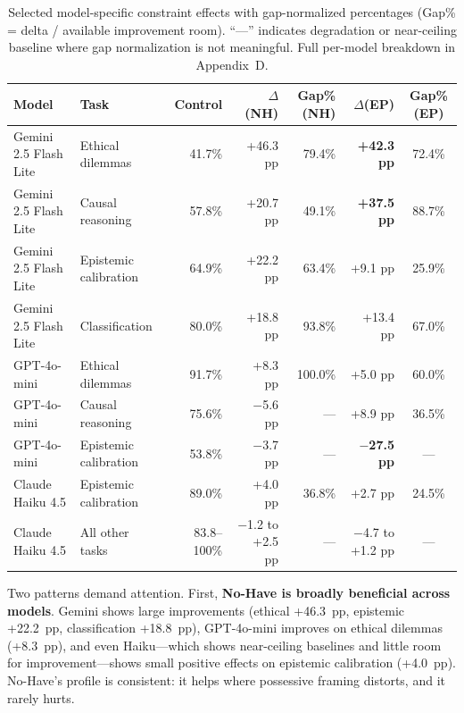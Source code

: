\documentclass[11pt,a4paper]{article}
\begin{document}
\begin{table}[t]
\centering
\caption{Selected model-specific constraint effects with gap-normalized percentages (Gap\% = delta / available improvement room). ``---'' indicates degradation or near-ceiling baseline where gap normalization is not meaningful. Full per-model breakdown in Appendix~D.}
\label{tab:model-effects}
\smallskip
\begin{tabular}{@{}llrrrrc@{}}
\toprule
Model & Task & Control & $\Delta$(NH) & Gap\%(NH) & $\Delta$(EP) & Gap\%(EP) \\
\midrule
Gemini 2.5 Flash Lite & Ethical dilemmas      & 41.7\% & +46.3 pp & 79.4\% & \textbf{+42.3 pp} & 72.4\% \\
Gemini 2.5 Flash Lite & Causal reasoning      & 57.8\% & +20.7 pp & 49.1\% & \textbf{+37.5 pp} & 88.7\% \\
Gemini 2.5 Flash Lite & Epistemic calibration & 64.9\% & +22.2 pp & 63.4\% & +9.1 pp            & 25.9\% \\
Gemini 2.5 Flash Lite & Classification        & 80.0\% & +18.8 pp & 93.8\% & +13.4 pp           & 67.0\% \\
GPT-4o-mini           & Ethical dilemmas      & 91.7\% & +8.3 pp  & 100.0\% & +5.0 pp           & 60.0\% \\
GPT-4o-mini           & Causal reasoning      & 75.6\% & $-$5.6 pp & ---   & +8.9 pp            & 36.5\% \\
GPT-4o-mini           & Epistemic calibration & 53.8\% & $-$3.7 pp & ---   & \textbf{$-$27.5 pp} & --- \\
Claude Haiku 4.5      & Epistemic calibration & 89.0\% & +4.0 pp  & 36.8\% & +2.7 pp            & 24.5\% \\
Claude Haiku 4.5      & All other tasks       & 83.8--100\% & $-$1.2 to +2.5 pp & --- & $-$4.7 to +1.2 pp & --- \\
\bottomrule
\end{tabular}
\end{table}

Two patterns demand attention. First, \textbf{No-Have is broadly beneficial across models}. Gemini shows large improvements (ethical +46.3~pp, epistemic +22.2~pp, classification +18.8~pp), GPT-4o-mini improves on ethical dilemmas (+8.3~pp), and even Haiku---which shows near-ceiling baselines and little room for improvement---shows small positive effects on epistemic calibration (+4.0~pp). No-Have's profile is consistent: it helps where possessive framing distorts, and it rarely hurts.
\end{document}
